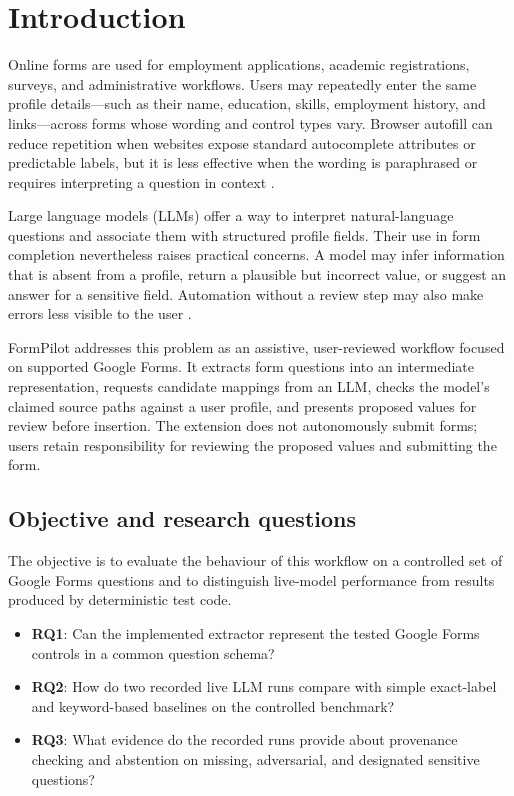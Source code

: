 \documentclass[]{einformatica}
\begin{document}
\section{Introduction}\label{sec:Introduction}

Online forms are used for employment applications, academic registrations, surveys, and administrative workflows. Users may repeatedly enter the same profile details---such as their name, education, skills, employment history, and links---across forms whose wording and control types vary. Browser autofill can reduce repetition when websites expose standard autocomplete attributes or predictable labels, but it is less effective when the wording is paraphrased or requires interpreting a question in context \cite{whatwg_autofill,bose2019field}.

Large language models (LLMs) offer a way to interpret natural-language questions and associate them with structured profile fields. Their use in form completion nevertheless raises practical concerns. A model may infer information that is absent from a profile, return a plausible but incorrect value, or suggest an answer for a sensitive field. Automation without a review step may also make errors less visible to the user \cite{ji2023survey,lin2020fill,amershi2019guidelines}.

FormPilot addresses this problem as an assistive, user-reviewed workflow focused on supported Google Forms. It extracts form questions into an intermediate representation, requests candidate mappings from an LLM, checks the model's claimed source paths against a user profile, and presents proposed values for review before insertion. The extension does not autonomously submit forms; users retain responsibility for reviewing the proposed values and submitting the form.

\subsection{Objective and research questions}
The objective is to evaluate the behaviour of this workflow on a controlled set of Google Forms questions and to distinguish live-model performance from results produced by deterministic test code.

\begin{itemize}
    \item \textbf{RQ1}: Can the implemented extractor represent the tested Google Forms controls in a common question schema?
    \item \textbf{RQ2}: How do two recorded live LLM runs compare with simple exact-label and keyword-based baselines on the controlled benchmark?
    \item \textbf{RQ3}: What evidence do the recorded runs provide about provenance checking and abstention on missing, adversarial, and designated sensitive questions?
\end{itemize}
\end{document}
